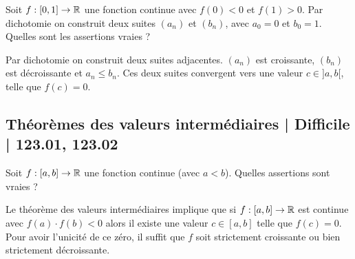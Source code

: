 \begin{question}

Soit $f : [0,1] \to \mathbb{R}$ une fonction continue avec $f(0)<0$ et $f(1)>0$.
Par dichotomie on construit deux suites $(a_n)$ et $(b_n)$, avec $a_0 = 0$ et $b_0 = 1$. Quelles sont les assertions vraies ?
\begin{answers}



\end{answers}
\begin{explanations}
Par dichotomie on construit deux suites adjacentes. $(a_n)$ est croissante, $(b_n)$ est décroissante et $a_n \le b_n$. Ces deux suites convergent vers une valeur $c\in]a,b[$, telle que $f(c)=0$.
\end{explanations}
\end{question}



\subsection{Théorèmes des valeurs intermédiaires | Difficile | 123.01, 123.02}


\begin{question}

Soit $f : [a,b] \to \mathbb{R}$ une fonction continue (avec $a < b$). Quelles assertions sont vraies ? 
\begin{answers}



\end{answers}
\begin{explanations}
Le théorème des valeurs intermédiaires implique que si $f : [a,b] \to \mathbb{R}$ est continue avec $f(a) \cdot f(b) < 0$ alors
il existe une valeur $c \in [a,b]$ telle que $f(c)=0$. Pour avoir l'unicité de ce zéro, il suffit que $f$ soit strictement croissante ou bien strictement décroissante.
\end{explanations}
\end{question}


